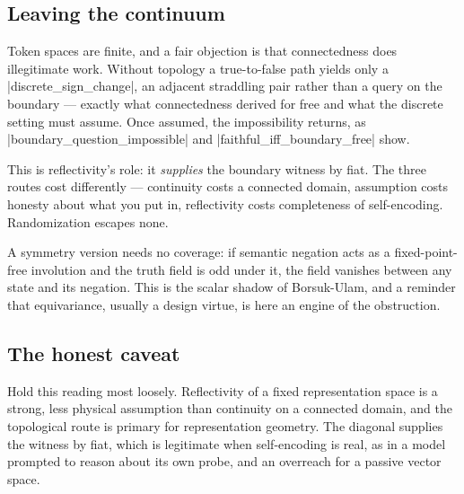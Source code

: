 \documentclass{memoir}
\begin{document}
\subsection{Leaving the continuum}\label{Two--Schemas--of--Impossibility-005F-005F-005F--Machine--Checked--Limits--of--Trustworthy--Machine--Learning-005F-005F-005F--and--Why--They--Tighten--with--Capability----Three--Trilemmata-005F-005F-005F--One--Theorem----The--Coupling--Theorem----Leaving--the--continuum}

Token spaces are finite, and a fair objection is that connectedness does
illegitimate work. Without topology a true-to-false path yields only a
\LeanVerb|discrete_sign_change|, an adjacent straddling pair rather than a query on the
boundary — exactly what connectedness derived for free and what the discrete
setting must assume. Once assumed, the impossibility returns, as
\LeanVerb|boundary_question_impossible| and \LeanVerb|faithful_iff_boundary_free| show.

This is reflectivity's role: it \emph{supplies} the boundary witness by fiat. The
three routes cost differently — continuity costs a connected domain, assumption
costs honesty about what you put in, reflectivity costs completeness of
self-encoding. Randomization escapes none.

A symmetry version needs no coverage: if semantic negation acts as a
fixed-point-free involution and the truth field is odd under it, the field
vanishes between any state and its negation. This is the scalar shadow of
Borsuk-Ulam, and a reminder that equivariance, usually a design virtue, is here
an engine of the obstruction.



\subsection{The honest caveat}\label{Two--Schemas--of--Impossibility-005F-005F-005F--Machine--Checked--Limits--of--Trustworthy--Machine--Learning-005F-005F-005F--and--Why--They--Tighten--with--Capability----Three--Trilemmata-005F-005F-005F--One--Theorem----The--Coupling--Theorem----The--honest--caveat}

Hold this reading most loosely. Reflectivity of a fixed representation space is
a strong, less physical assumption than continuity on a connected domain, and
the topological route is primary for representation geometry. The diagonal
supplies the witness by fiat, which is legitimate when self-encoding is real, as
in a model prompted to reason about its own probe, and an overreach for a
passive vector space.
\end{document}
